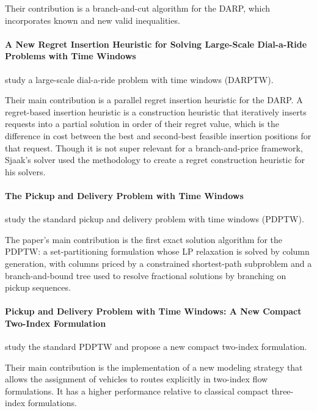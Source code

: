 \documentclass[preprint,11pt,authoryear]{elsarticle}
\begin{document}
Their contribution is a branch-and-cut algorithm for the DARP, which incorporates known and new valid inequalities.


\paragraph{\textbf{A New Regret Insertion Heuristic for Solving Large-Scale Dial-a-Ride Problems with Time Windows}}

\citet{dianaNewRegretInsertion2004} study a large-scale
dial-a-ride problem with time windows (DARPTW).

Their main contribution is a parallel regret insertion heuristic for the
DARP. A regret-based insertion heuristic is a construction heuristic that
iteratively inserts requests into a partial solution in order of their regret
value, which is the difference in cost between the best and second-best
feasible insertion positions for that request. Though it is not super relevant for a branch-and-price framework, Sjaak's solver used the methodology to create a regret construction heuristic for his solvers.


\paragraph{\textbf{The Pickup and Delivery Problem with Time Windows}}

\citet{dumasPickupDeliveryProblem1991} study the standard pickup and
delivery problem with time windows (PDPTW).

The paper's main contribution is the first exact solution algorithm for
the PDPTW: a set-partitioning formulation whose LP relaxation is solved
by column generation, with columns priced by a constrained shortest-path
subproblem and a branch-and-bound tree used to resolve fractional
solutions by branching on pickup sequences.


\paragraph{\textbf{Pickup and Delivery Problem with Time Windows: A New Compact Two-Index Formulation}}

\citet{furtadoPickupDeliveryProblem2017} study the standard PDPTW and propose a new compact two-index formulation.

Their main contribution is the implementation of a new modeling strategy that allows the assignment of vehicles
to routes explicitly in two-index flow formulations. It has a higher performance relative to classical compact three-index formulations.
\end{document}
